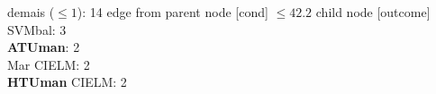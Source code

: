 {{{{{%
demais ($\leq 1$): 14} edge from parent node [cond] {$\leq42.2$}}
child {node [outcome] {
SVMbal: 3\\
\textbf{ATUman}: 2\\
Mar CIELM: 2\\
\textbf{HTUman} CIELM: 2\\
}}}}}
